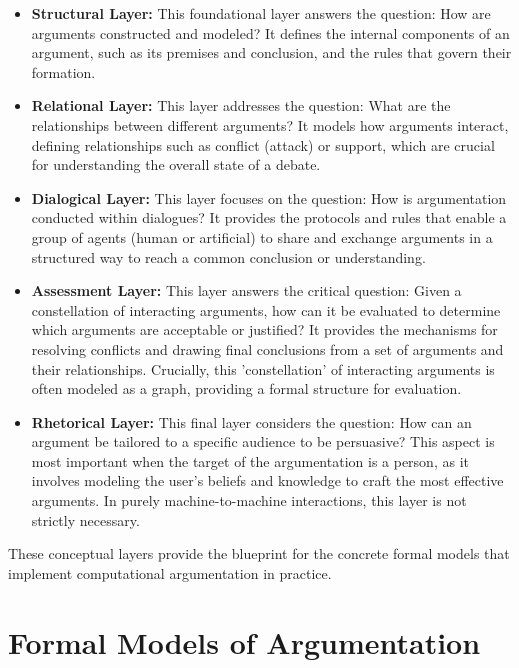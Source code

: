 \documentclass{scrbook}
\begin{document}
\begin{itemize}
    \item 
    \textbf{Structural Layer:} This foundational layer answers the question: How are arguments constructed and modeled? It defines the internal components of an argument, such as its premises and conclusion, and the rules that govern their formation.

    \item 
    \textbf{Relational Layer:} This layer addresses the question: What are the relationships between different arguments? It models how arguments interact, defining relationships such as conflict (attack) or support, which are crucial for understanding the overall state of a debate.

    \item 
    \textbf{Dialogical Layer:} This layer focuses on the question: How is argumentation conducted within dialogues? It provides the protocols and rules that enable a group of agents (human or artificial) to share and exchange arguments in a structured way to reach a common conclusion or understanding.

    \item 
    \textbf{Assessment Layer:} This layer answers the critical question: Given a constellation of interacting arguments, how can it be evaluated to determine which arguments are acceptable or justified? It provides the mechanisms for resolving conflicts and drawing final conclusions from a set of arguments and their relationships. Crucially, this 'constellation' of interacting arguments is often modeled as a graph, providing a formal structure for evaluation.

    \item
    \textbf{Rhetorical Layer:} This final layer considers the question: How can an argument be tailored to a specific audience to be persuasive? This aspect is most important when the target of the argumentation is a person, as it involves modeling the user's beliefs and knowledge to craft the most effective arguments. In purely machine-to-machine interactions, this layer is not strictly necessary.
\end{itemize}

These conceptual layers provide the blueprint for the concrete formal models that implement computational argumentation in practice.

\chapter{Formal Models of Argumentation}
\end{document}
